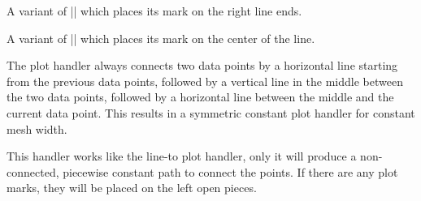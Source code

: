 \begin{command}{\pgfplothandlerconstantlinetomarkright}
    A variant of |\pgfplothandlerconstantlineto| which places its mark on the
    right line ends.
\begin{codeexample}[]
\end{codeexample}
\end{command}

\begin{command}{\pgfplothandlerconstantlinetomarkmid}
    A variant of |\pgfplothandlerconstantlineto| which places its mark on the
    center of the line.
\begin{codeexample}[]
\end{codeexample}
    The plot handler always connects two data points by a horizontal line
    starting from the previous data points, followed by a vertical line in the
    middle between the two data points, followed by a horizontal line between
    the middle and the current data point. This results in a symmetric constant
    plot handler for constant mesh width.
\end{command}

\begin{command}{\pgfplothandlerjumpmarkleft}
    This handler works like the line-to plot handler, only it will produce a
    non-connected, piecewise constant path to connect the points. If there are
    any plot marks, they will be placed on the left open pieces.
\begin{codeexample}[]
\end{codeexample}
\end{command}

